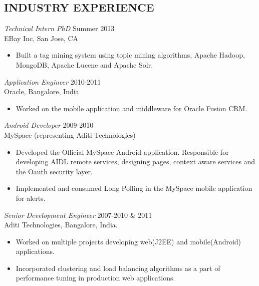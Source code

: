 \documentclass[line,margin]{res}
\begin{document}
\begin{resume}
\section{INDUSTRY EXPERIENCE} 
{\sl Technical Intern PhD} \hfill Summer 2013\\
                EBay Inc, San Jose, CA
                 \begin{itemize}  \itemsep -2pt %
                 \item Built a tag mining system using topic mining algorithms, Apache Hadoop, MongoDB, Apache Lucene and Apache Solr.
                \end{itemize}
{\sl Application Engineer} \hfill 2010-2011 \\
               Oracle, 
                Bangalore, India
                 \begin{itemize}  \itemsep -2pt %
                 \item Worked on the mobile application and middleware for
Oracle Fusion CRM. 
                \end{itemize}
 
                {\sl Android Developer} \hfill            2009-2010 \\
                MySpace (representing Aditi Technologies) 
                 \begin{itemize}  \itemsep -2pt %
                 \item Developed the Official MySpace Android application. Responsible for developing AIDL
remote services, designing pages, context aware services and the Oauth security layer. 
 \item Implemented and consumed Long Polling in the MySpace mobile application for alerts.
                 \end{itemize} 
                {\sl Senior Development Engineer} \hfill        2007-2010 \& 2011 \\
                Aditi Technologies, Bangalore, India.
                  \begin{itemize}
                   \item Worked on multiple projects developing web(J2EE) and mobile(Android) applications.
                    \item Incorporated clustering and load balancing algorithms as a part of performance tuning in production web applications. 
                   \end{itemize} 


\end{resume}
\end{document}

